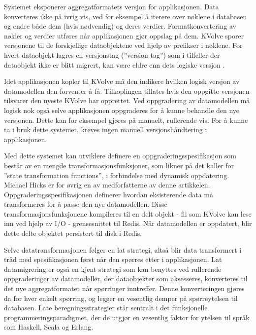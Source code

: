 Systemet eksponerer aggregatformatets versjon for applikasjonen. Data konverteres ikke på ivrig vis, ved for eksempel å iterere over nøklene i databasen og endre både dem (hvis nødvendig) og deres verdier. Formatkonvertering av nøkler og verdier utføres når applikasjonen gjør oppslag på dem. KVolve sporer versjonene til de forskjellige dataobjektene ved hjelp av prefikser i nøklene. For hvert dataobjekt lagres en versjonstag (''version tag'') som i tilfeller der dataobjekt ikke er blitt migrert, kan være eldre enn dets logiske versjon \citep{saur2016}.

Idet applikasjonen kopler til KVolve må den indikere hvilken logisk versjon av datamodellen den forventer å få. Tilkoplingen tillates hvis den oppgitte versjonen tilsvarer den nyeste KVolve har opprettet. Ved oppgradering av datamodellen må logisk nok også selve applikasjonen oppgraderes for å kunne behandle den nye versjonen. Dette kan for eksempel gjøres på manuelt, rullerende vis. For å kunne ta i bruk dette systemet, kreves ingen manuell versjonshåndtering i applikasjonen. %

Med dette systemet kan utviklere definere en oppgraderingsspesifikasjon som består av en mengde transformasjonsfunksjoner, som likner på det \cite{hicks2005dsu} kaller for ''state transformation functions'', i forbindelse med dynamisk oppdatering. Michael Hicks er for øvrig en av medforfatterne av denne artikkelen. Oppgraderingsspesifikasjonen definerer hvordan eksisterende data må transformeres for å passe den nye datamodellen. Disse transformasjonsfunksjonene kompileres til en delt objekt - fil som KVolve kan lese inn ved hjelp av I/O - grensesnittet til Redis. Når datamodellen er oppdatert, blir dette delte objektet persistert til disk i Redis.

Selve datatransformasjonen følger en lat strategi, altså blir data transformert i tråd med spesifikasjonen først når den spørres etter i applikasjonen. Lat datamigrering er også en kjent strategi som kan benyttes ved rullerende oppgraderinger av datamodeller, der dataobjekter som aksesseres, konverteres til det nye aggregatformatet når spørringer inntreffer. Denne konverteringen gjøres da for hver enkelt spørring, og legger en vesentlig demper på spørreytelsen til databasen. Late beregningsstrategier står sentralt i det funksjonelle programmeringsparadigmet, der de utgjør en vesentlig faktor for ytelsen til språk som Haskell, Scala og Erlang.

